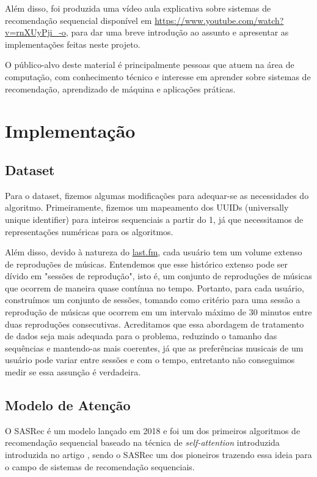Além disso, foi produzida uma vídeo aula explicativa sobre sistemas de
recomendação sequencial disponível em \url{https://www.youtube.com/watch?v=rnXUyPji_-o},
para dar uma breve introdução ao assunto e apresentar as implementações
feitas neste projeto.

O público-alvo deste material é principalmente pessoas que atuem na área de
computação, com conhecimento técnico e interesse em aprender sobre sistemas de
recomendação, aprendizado de máquina e aplicações práticas.

\section*{Implementação}

\subsection*{Dataset}

Para o dataset, fizemos algumas modificações para adequar-se
as necessidades do algoritmo. Primeiramente, fizemos um
mapeamento dos UUIDs (universally unique identifier) para inteiros
sequenciais a partir do 1, já que necessitamos de representações
numéricas para os algoritmos.

Além disso, devido à natureza do \url{last.fm}, cada usuário tem
um volume extenso de reproduções de músicas. Entendemos que esse
histórico extenso pode ser dívido em "sessões de reprodução", 
isto é, um conjunto de reproduções de músicas que ocorrem de 
maneira quase contínua no tempo. Portanto, para cada usuário,
construímos um conjunto de sessões, tomando como critério para
uma sessão a reprodução de músicas que ocorrem em um intervalo
máximo de 30 minutos entre duas reproduções consecutivas. Acreditamos
que essa abordagem de tratamento de dados seja mais adequada para
o problema, reduzindo o tamanho das sequências e mantendo-as mais
coerentes, já que as preferências musicais de um usuário pode variar
entre sessões e com o tempo, entretanto não conseguimos medir se
essa assunção é verdadeira.

\subsection*{Modelo de Atenção}

O SASRec \cite{sasrec} é um modelo lançado em 2018 e foi um dos primeiros 
algoritmos de recomendação sequencial baseado na técnica de \textit{self-attention}
introduzida introduzida no artigo  
\cite{attetionisallyouneed}, sendo o SASRec um dos pioneiros trazendo essa ideia
para o campo de sistemas de recomendação sequenciais.

